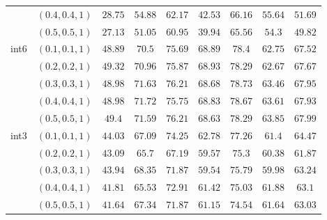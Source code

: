 \begin{table*}[h!]
{\begin{tabular}{@{}ccccccccc@{}}
& $(0.4,0.4,1)$ & $28.75$ & $54.88$ & $62.17$ & $42.53$ & $66.16$ & $55.64$ & $51.69$ \\
& $(0.5,0.5,1)$ & $27.13$ & $51.05$ & $60.95$ & $39.94$ & $65.56$ & $54.3$  & $49.82$ \\ \midrule \midrule
                       \multirow{5}{*}{int6} & $(0.1,0.1,1)$ & $48.89$ & $70.5$  & $75.69$ & $68.89$ & $78.4$  & $62.75$ & $67.52$ \\
& $(0.2,0.2,1)$ & $49.32$ & $70.96$ & $75.87$ & $68.93$ & $78.29$ & $62.67$ & $67.67$ \\
& $(0.3,0.3,1)$ & $48.98$ & $71.63$ & $76.21$ & $68.68$ & $78.73$ & $63.46$ & $67.95$ \\
& $(0.4,0.4,1)$ & $48.98$ & $71.72$ & $75.75$ & $68.83$ & $78.67$ & $63.61$ & $67.93$ \\
& $(0.5,0.5,1)$ & $49.4$  & $71.59$ & $76.21$ & $68.63$ & $78.29$ & $63.85$ & $67.99$ \\
 \midrule

                       \multirow{5}{*}{int3} & $(0.1,0.1,1)$ & $44.03$ & $67.09$ & $74.25$ & $62.78$ & $77.26$ & $61.4$  & $64.47$ \\
& $(0.2,0.2,1)$ & $43.09$ & $65.7$  & $67.19$ & $59.57$ & $75.3$  & $60.38$ & $61.87$ \\
& $(0.3,0.3,1)$ & $43.94$ & $68.35$ & $71.87$ & $59.54$ & $75.79$ & $59.98$ & $63.24$ \\
& $(0.4,0.4,1)$ & $41.81$ & $65.53$ & $72.91$ & $61.42$ & $75.03$ & $61.88$ & $63.1$  \\
& $(0.5,0.5,1)$ & $41.64$ & $67.34$ & $71.87$ & $61.15$ & $74.54$ & $61.64$ & $63.03$ \\\bottomrule
\end{tabular}
}
\end{table*}
